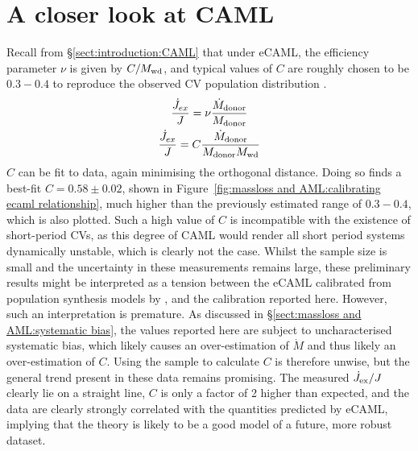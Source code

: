 \section{A closer look at CAML}
Recall from \S\ref{sect:introduction:CAML} that under eCAML, the efficiency parameter $\nu$ is given by $C/M_{\rm wd}$, and typical values of $C$ are roughly chosen to be $0.3 - 0.4$ to reproduce the observed CV population distribution \citep{Schreiber2016}.
\begin{gather}
    \frac{\dot J_{ex}}{J} = \nu \frac{\dot M_{\rm donor}}{M_{\rm donor}} \label{eqn:caml general} \\
    \frac{\dot J_{ex}}{J} = C \frac{\dot M_{\rm donor}}{M_{\rm donor} M_{\rm wd}} \label{eqn:ecaml}
\end{gather}
$C$ can be fit to data, again minimising the orthogonal distance.
Doing so finds a best-fit $C = 0.58\pm0.02$, shown in Figure~\ref{fig:massloss and AML:calibrating ecaml relationship}, much higher than the previously estimated range of $0.3 - 0.4$, which is also plotted.
Such a high value of $C$ is incompatible with the existence of short-period CVs, as this degree of CAML would render all short period systems dynamically unstable, which is clearly not the case. Whilst the sample size is small and the uncertainty in these measurements remains large, these preliminary results might be interpreted as a tension between the eCAML calibrated from population synthesis models by \citet{Schreiber2016}, and the calibration reported here.
However, such an interpretation is premature. As discussed in \S\ref{sect:massloss and AML:systematic bias}, the values reported here are subject to uncharacterised systematic bias, which likely causes an over-estimation of $\dot M$ and thus likely an over-estimation of $C$. Using the sample to calculate $C$ is therefore unwise, but the general trend present in these data remains promising. The measured $\dot J_{\rm ex} / J$ clearly lie on a straight line, $C$ is only a factor of 2 higher than expected, and the data are clearly strongly correlated with the quantities predicted by eCAML, implying that the theory is likely to be a good model of a future, more robust dataset.



